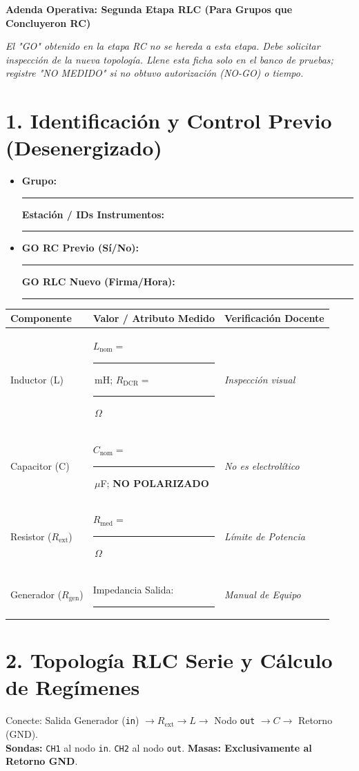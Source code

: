\documentclass[11pt, a4paper]{article}
\begin{document}
\begin{tcolorbox}[colback=warnred!5!white, colframe=warnred, title=\textbf{Pauta Estricta: NO ENERGIZAR SIN "GO" PARA RLC}]
    \centering \textbf{Adenda Operativa: Segunda Etapa RLC (Para Grupos que Concluyeron RC)}
\end{tcolorbox}

\noindent\textit{El "GO" obtenido en la etapa RC no se hereda a esta etapa. Debe solicitar inspección de la nueva topología. Llene esta ficha solo en el banco de pruebas; registre "NO MEDIDO" si no obtuvo autorización (NO-GO) o tiempo.}

\section*{1. Identificación y Control Previo (Desenergizado)}
\begin{itemize}
    \item \textbf{Grupo:} \rule{4cm}{0.4pt} \quad \textbf{Estación / IDs Instrumentos:} \rule{4cm}{0.4pt}
    \item \textbf{GO RC Previo (Sí/No):} \rule{1.5cm}{0.4pt} \quad \textbf{GO RLC Nuevo (Firma/Hora):} \rule{3.5cm}{0.4pt}
\end{itemize}

\vspace{0.1cm}
\renewcommand{\arraystretch}{1.5}
\noindent
\begin{tabularx}{\textwidth}{
  >{\RaggedRight\arraybackslash\hsize=1.2\hsize}X 
  >{\RaggedRight\arraybackslash\hsize=0.8\hsize}X 
  >{\RaggedRight\arraybackslash\hsize=1.0\hsize}X}
\toprule
\textbf{Componente} & \textbf{Valor / Atributo Medido} & \textbf{Verificación Docente} \\ 
\midrule
Inductor (L) & $L_{\text{nom}}=$ \rule{1.5cm}{0.4pt}\,mH; \quad $R_{\text{DCR}}=$ \rule{1cm}{0.4pt}\,$\Omega$ & [ ] \textit{Inspección visual} \\
Capacitor (C) & $C_{\text{nom}}=$ \rule{1.5cm}{0.4pt}\,$\mu$F; \quad \textbf{NO POLARIZADO} & [ ] \textit{No es electrolítico} \\
Resistor ($R_{\text{ext}}$) & $R_{\text{med}}=$ \rule{1.5cm}{0.4pt}\,$\Omega$ & [ ] \textit{Límite de Potencia} \\
Generador ($R_{\text{gen}}$) & Impedancia Salida: \rule{2cm}{0.4pt} & [ ] \textit{Manual de Equipo} \\
\bottomrule
\end{tabularx}

\section*{2. Topología RLC Serie y Cálculo de Regímenes}
\noindent Conecte: Salida Generador (\texttt{in}) $\to R_{\text{ext}} \to L \to$ Nodo \texttt{out} $\to C \to$ Retorno (GND). \\
\textbf{Sondas:} \texttt{CH1} al nodo \texttt{in}. \texttt{CH2} al nodo \texttt{out}. \textbf{Masas: Exclusivamente al Retorno GND}.
\end{document}
